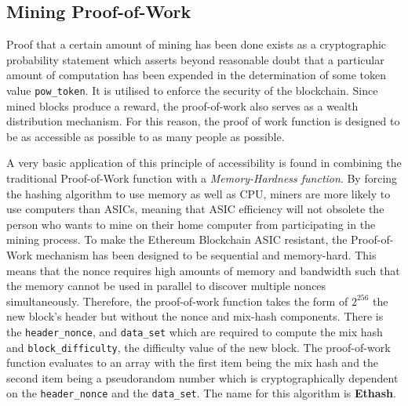 \documentclass[10pt,letterpaper,leqno,bibliography=totoc]{scrartcl}
\newenvironment{alphafootnotes}
{\par\edef\savedfootnotenumber{\number\value{footnote}}
\renewcommand{\thefootnote}{\alph{footnote}}
\setcounter{footnote}{0}}
{\par\setcounter{footnote}{\savedfootnotenumber}}
\begin{document}
\begin{alphafootnotes}
\begin{multicols*}{2}
		
		\subsection{Mining Proof-of-Work} Proof that a certain amount of mining has been done exists as a cryptographic probability statement which asserts beyond reasonable doubt that a particular amount of computation has been expended in the determination of some token value \texttt{pow\_token}. It is utilised to enforce the security of the blockchain. Since mined blocks produce a reward, the proof-of-work also serves  as a wealth distribution mechanism. For this reason, the  proof of work function is designed to be as accessible as possible to as many people as possible. 

		A very basic application of this principle of accessibility is found in combining the traditional Proof-of-Work function with a \textit{Memory-Hardness function}. By forcing the hashing algorithm to use memory as well as CPU, miners are more likely to use computers than ASICs, meaning that ASIC efficiency will not obsolete the person who wants to mine on their home computer from participating in the mining process.  To make the Ethereum Blockchain ASIC resistant, the Proof-of-Work mechanism has been designed to be sequential and  memory-hard. This means that the nonce requires high amounts of memory and bandwidth such that the memory cannot be used in parallel to discover multiple nonces simultaneously. Therefore, the proof-of-work function takes the form of $2^{256}$ the new block’s header but without the nonce and mix-hash components. There is the \texttt{header\_nonce}, and \texttt{data\_set} which are required  to compute the mix hash and \texttt{block\_difficulty}, the difficulty value of the new block. The proof-of-work function evaluates to an array with the first item being the mix hash and the second item being a pseudorandom number which is cryptographically dependent on the \texttt{header\_nonce} and the \texttt{data\_set}. The name for this algorithm is \textbf{Ethash}. 
			

\end{multicols*}
\end{alphafootnotes}
\end{document}
